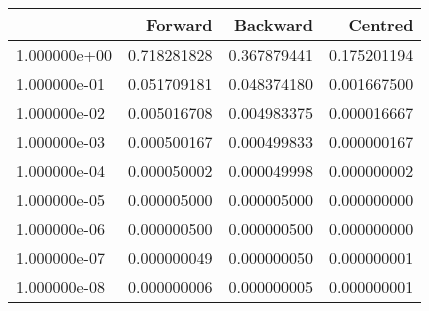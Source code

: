 \begin{table}
\centering
\label{Table 2.1, Bodenheimer, Repeated, Error Size}
\begin{tabular}{lrrr}
\toprule
{} &     Forward &    Backward &     Centred \\
\midrule
1.000000e+00 & 0.718281828 & 0.367879441 & 0.175201194 \\
1.000000e-01 & 0.051709181 & 0.048374180 & 0.001667500 \\
1.000000e-02 & 0.005016708 & 0.004983375 & 0.000016667 \\
1.000000e-03 & 0.000500167 & 0.000499833 & 0.000000167 \\
1.000000e-04 & 0.000050002 & 0.000049998 & 0.000000002 \\
1.000000e-05 & 0.000005000 & 0.000005000 & 0.000000000 \\
1.000000e-06 & 0.000000500 & 0.000000500 & 0.000000000 \\
1.000000e-07 & 0.000000049 & 0.000000050 & 0.000000001 \\
1.000000e-08 & 0.000000006 & 0.000000005 & 0.000000001 \\
\bottomrule
\end{tabular}
\end{table}
